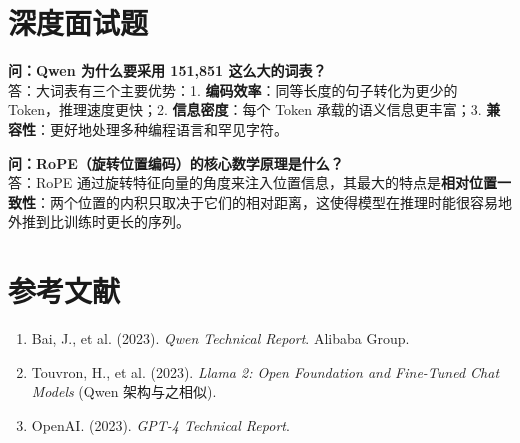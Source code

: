 \documentclass[12pt, a4paper]{article}
\begin{document}
\section{深度面试题}

\textbf{问：Qwen 为什么要采用 151,851 这么大的词表？}\\
答：大词表有三个主要优势：1. \textbf{编码效率}：同等长度的句子转化为更少的 Token，推理速度更快；2. \textbf{信息密度}：每个 Token 承载的语义信息更丰富；3. \textbf{兼容性}：更好地处理多种编程语言和罕见字符。

\textbf{问：RoPE（旋转位置编码）的核心数学原理是什么？}\\
答：RoPE 通过旋转特征向量的角度来注入位置信息，其最大的特点是\textbf{相对位置一致性}：两个位置的内积只取决于它们的相对距离，这使得模型在推理时能很容易地外推到比训练时更长的序列。

\section{参考文献}
\begin{enumerate}
    \item Bai, J., et al. (2023). \textit{Qwen Technical Report}. Alibaba Group.
    \item Touvron, H., et al. (2023). \textit{Llama 2: Open Foundation and Fine-Tuned Chat Models} (Qwen 架构与之相似).
    \item OpenAI. (2023). \textit{GPT-4 Technical Report}.
\end{enumerate}
\end{document}
